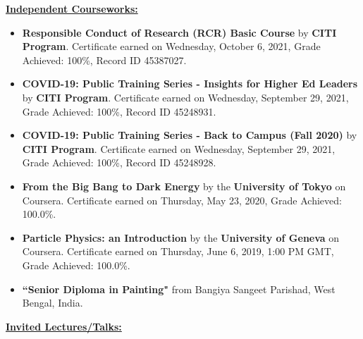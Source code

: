 \documentclass[10pt]{report}
\begin{document}
\begin{large}\vspace{2mm}
\textbf{\underline{Independent Courseworks:}}
\end{large}
\begin{itemize}
\item \textbf{Responsible Conduct of Research (RCR) Basic Course} by \textbf{CITI Program}. Certificate earned on Wednesday, October 6, 2021, Grade Achieved: 100\%, Record ID 45387027.
\item \textbf{COVID-19: Public Training Series - Insights for Higher Ed Leaders} by \textbf{CITI Program}. Certificate earned on Wednesday, September 29, 2021, Grade Achieved: 100\%, Record ID 45248931.
\item \textbf{COVID-19: Public Training Series - Back to Campus (Fall 2020)} by \textbf{CITI Program}. Certificate earned on Wednesday, September 29, 2021, Grade Achieved: 100\%, Record ID 45248928.
\item \textbf{From the Big Bang to Dark Energy} by the \textbf{University of Tokyo} on Coursera. Certificate earned on Thursday, May 23, 2020, Grade Achieved: 100.0\%.
\item \textbf{Particle Physics: an Introduction} by the \textbf{University of Geneva} on Coursera. Certificate earned on Thursday, June 6, 2019, 1:00 PM GMT, Grade Achieved: 100.0\%.
\item \textbf{``Senior Diploma in Painting"} from Bangiya Sangeet Parishad, West Bengal, India.
\end{itemize}
\begin{large}\vspace{2mm}
\textbf{\underline{Invited Lectures/Talks:}}
\end{large}
\end{document}
